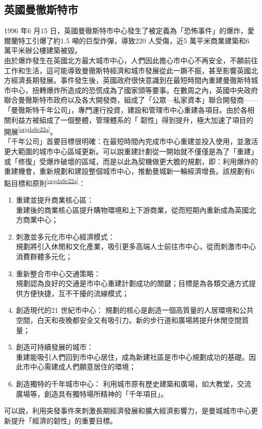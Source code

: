 \documentclass[a4paper,12pt]{article}
\begin{document}
\subsection{英國曼徹斯特市}
\label{sec:org94df39a}
1996 年6 月15 日，英國曼徹斯特市中心發生了被定義為「恐怖事件」的爆炸，愛爾蘭特工引爆了約1.5 噸的巨型炸彈，導致220 人受傷，近5 萬平米商業建築和6 萬平米辦公樓建築被毀。\\

由於爆炸發生在英國北方最大城市中心，人們因此擔心市中心不再安全，不願前往工作和生活，這可能導致曼徹斯特經濟和城市發展從此一蹶不振，甚至影響英國北方經濟長期發展。事件發生後，英國政府很快意識到在最短時間內重建曼徹斯特城市中心，扭轉爆炸所造成的恐慌成為了國家頭等要事。在數周之內，英國中央政府聯合曼徹斯特市政府以及各大開發商，組成了「公眾—私家資本」聯合開發商——「曼徹斯特千年公司」，專門運行投資，建設和管理市中心重建各項目。由於各相關利益方被組成了一個整體，管理體系的「 韌性」得到提升，極大加速了項目的開展\textsuperscript{\ref{orgda6e22a}}。\\

「千年公司」首要目標很明確：在最短時間內完成市中心重建並投入使用，並激活更大範圍的城市中心區域更新。可以說重建計劃從一開始就不僅僅是為了「重建」或「修復」受爆炸破壞的區域，而是以此為契機做更大膽的規劃，即：利用爆炸的重建機會，重新規劃和建設整個城市中心，推動曼城新一輪經濟增長。該規劃有6 點目標和原則\textsuperscript{\ref{orgda6e22a}}：\\
\begin{enumerate}
\item 重建並提升商業核心區：\\
重建後的商業核心區提升購物環境和上下游商業，從而短期內重新成為英國北方商業中心；\\
\item 刺激並多元化市中心經濟模式：\\
規劃將引入休閒和文化產業，吸引更多高端人士前往市中心，從而刺激市中心消費群體多元化；\\
\item 重新整合市中心交通策略：\\
規劃認為良好的交通是市中心重建計劃成功的關鍵；目標是為各類交通方式提供方便快捷，互不干擾的流線模式；\\
\item 創造現代的21 世紀市中心：   規劃的核心是創造一個高質量的人居環境和公共空間，白天和夜晚都安全又有吸引力。新的步行道和廣場將提升休閒空間質量；\\
\item 創造可持續發展的城市：\\
重建能吸引人們回到市中心居住，成為新建社區是市中心規劃成功的基礎。因此市中心需建成人們願意居住的環境；\\
\item 創造獨特的千年城市中心：   利用城市原有歷史建築和廣場，如大教堂，交流廣場等，創造具有獨特場所精神的「千年項目」。\\
\end{enumerate}
可以說，利用突發事件來刺激長期經濟發展和擴大經濟影響力，是曼城城市中心更新提升「經濟的韌性」的重要目標。\\
\end{document}

